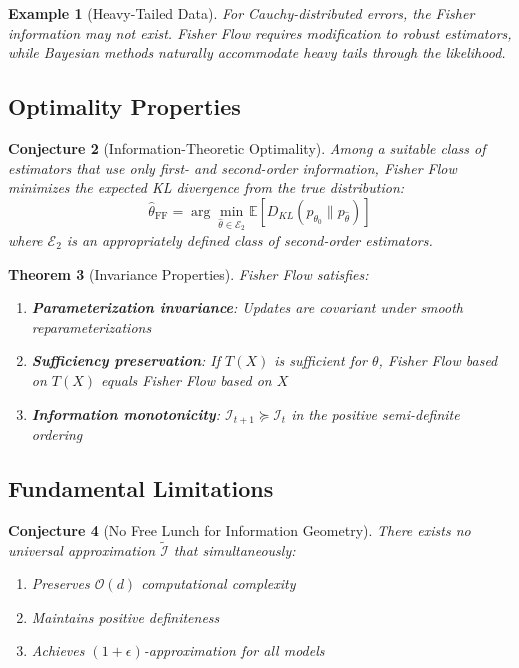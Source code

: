 \documentclass[11pt]{article}
\newtheorem{theorem}{Theorem}
\newtheorem{example}[theorem]{Example}
\newtheorem{conjecture}[theorem]{Conjecture}
\begin{document}
\begin{example}[Heavy-Tailed Data]
For Cauchy-distributed errors, the Fisher information may not exist. Fisher Flow requires modification to robust estimators, while Bayesian methods naturally accommodate heavy tails through the likelihood.
\end{example}

\subsection{Optimality Properties}

\begin{conjecture}[Information-Theoretic Optimality]
\label{thm:info_optimality}
Among a suitable class of estimators that use only first- and second-order information, Fisher Flow minimizes the expected KL divergence from the true distribution:
\begin{equation}
\hat{\theta}_{\text{FF}} = \arg\min_{\hat{\theta} \in \mathcal{E}_2} \mathbb{E}[D_{KL}(p_{\theta_0} \| p_{\hat{\theta}})]
\end{equation}
where $\mathcal{E}_2$ is an appropriately defined class of second-order estimators.
\end{conjecture}

\begin{theorem}[Invariance Properties]
Fisher Flow satisfies:
\begin{enumerate}
\item \textbf{Parameterization invariance}: Updates are covariant under smooth reparameterizations
\item \textbf{Sufficiency preservation}: If $T(X)$ is sufficient for $\theta$, Fisher Flow based on $T(X)$ equals Fisher Flow based on $X$
\item \textbf{Information monotonicity}: $\mathcal{I}_{t+1} \succeq \mathcal{I}_t$ in the positive semi-definite ordering
\end{enumerate}
\end{theorem}

\subsection{Fundamental Limitations}

\begin{conjecture}[No Free Lunch for Information Geometry]
\label{thm:no_free_lunch}
There exists no universal approximation $\tilde{\mathcal{I}}$ that simultaneously:
\begin{enumerate}
\item Preserves $\mathcal{O}(d)$ computational complexity
\item Maintains positive definiteness
\item Achieves $(1+\epsilon)$-approximation for all models
\end{enumerate}
\end{conjecture}
\end{document}
